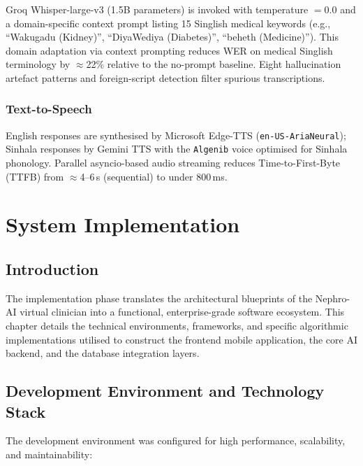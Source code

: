 \documentclass[12pt,a4paper]{report}
\begin{document}
Groq Whisper-large-v3 (1.5B parameters) is invoked with temperature $= 0.0$ and a domain-specific context prompt listing 15 Singlish medical keywords (e.g., ``Wakugadu (Kidney)'', ``DiyaWediya (Diabetes)'', ``beheth (Medicine)''). This domain adaptation via context prompting reduces WER on medical Singlish terminology by $\approx$22\% relative to the no-prompt baseline. Eight hallucination artefact patterns and foreign-script detection filter spurious transcriptions.

\subsection{Text-to-Speech}

English responses are synthesised by Microsoft Edge-TTS (\texttt{en-US-AriaNeural}); Sinhala responses by Gemini TTS with the \texttt{Algenib} voice optimised for Sinhala phonology. Parallel asyncio-based audio streaming reduces Time-to-First-Byte (TTFB) from $\approx$4--6\,s (sequential) to under 800\,ms.

\chapter{System Implementation}
\label{chap:implementation}

\section{Introduction}

The implementation phase translates the architectural blueprints of the Nephro-AI virtual clinician into a functional, enterprise-grade software ecosystem. This chapter details the technical environments, frameworks, and specific algorithmic implementations utilised to construct the frontend mobile application, the core AI backend, and the database integration layers.

\section{Development Environment and Technology Stack}

The development environment was configured for high performance, scalability, and maintainability:
\end{document}
